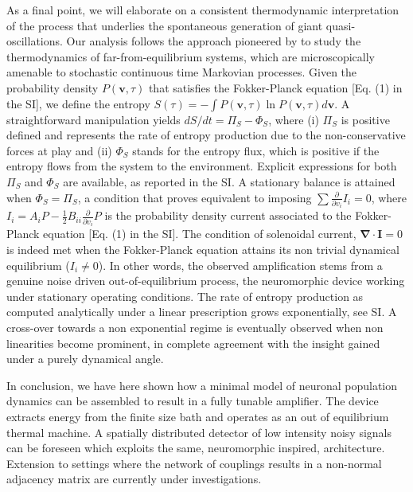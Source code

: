 \documentclass[showpacs,prl,superscriptaddress,nofootinbib, twocolumn]{revtex4}
\begin{document}
As a final point, we will elaborate on a consistent thermodynamic interpretation of the process that underlies the spontaneous generation of giant quasi-oscillations. Our analysis follows the approach pioneered by \cite{thermo0,thermo, thermo1} to study the thermodynamics of far-from-equilibrium systems,  which are microscopically amenable to stochastic continuous time Markovian processes. Given the probability density $P({\boldsymbol v}, \tau)$ that satisfies the Fokker-Planck equation [Eq. (1) in the SI], we define the entropy $S(\tau)=-\int P({\boldsymbol v},\tau)\ln P({\boldsymbol v},\tau) d{\boldsymbol v}$.  A straightforward manipulation yields $dS/dt=\Pi_S -\Phi_S$, where (i) $\Pi_S$ is positive defined and represents the rate of entropy production due to the non-conservative forces at play and (ii) $\Phi_S$ stands for the entropy flux, which is positive if the entropy flows from the system to the environment. Explicit expressions for both $\Pi_S$ and $\Phi_S$ are available, as reported in the SI. A stationary balance is  attained when $\Phi_S=\Pi_S$, a condition that proves equivalent to imposing $\sum \frac{\partial}{\partial v_i} I_i = 0$, where 
$I_i = A_i P - \frac{1}{2} B_{ii} \frac{\partial}{\partial v_i} P$ is the probability density current associated to the Fokker-Planck equation [Eq. (1) in the SI]. The condition of solenoidal  current, ${\boldsymbol \nabla} \cdot {\boldsymbol I}=0$ is indeed met when the Fokker-Planck equation attains its non trivial dynamical equilibrium ($I_i \ne 0$). In other words, the observed amplification stems from a genuine noise driven out-of-equilibrium process, the neuromorphic device working  under stationary operating conditions. The rate of entropy production as computed analytically under a linear prescription grows exponentially, see SI. A cross-over towards a non exponential regime is eventually observed when non linearities become prominent, in complete agreement with the insight gained under a purely dynamical angle.

In conclusion, we have here shown how a minimal model of neuronal population dynamics can be assembled to result in a fully tunable amplifier. The device extracts energy from the finite size bath and operates as an out of equilibrium thermal machine. A spatially distributed detector of low intensity noisy signals can be foreseen which exploits the same, neuromorphic inspired, architecture. Extension to settings where the network of couplings results 
in a  non-normal adjacency matrix \cite{non_norm1, non_norm2} are currently under investigations. 
\end{document}
